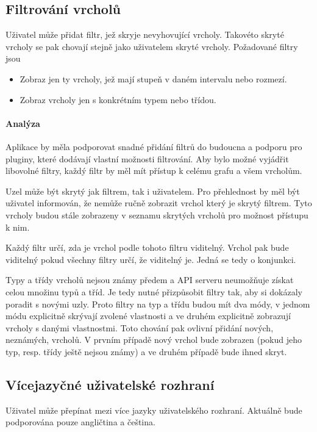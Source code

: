 \subsection{Filtrování vrcholů}
Uživatel může přidat filtr, jež skryje nevyhovující vrcholy. Takovéto skryté vrcholy se pak chovají stejně jako uživatelem skryté vrcholy. Požadované filtry jsou
\begin{itemize}
    \item Zobraz jen ty vrcholy, jež mají stupeň v daném intervalu nebo rozmezí.
    \item Zobraz vrcholy jen s konkrétním typem nebo třídou.
\end{itemize}

\paragraph{Analýza} Aplikace by měla podporovat snadné přidání filtrů do budoucna a podporu pro pluginy, které dodávají vlastní možnosti filtrování. Aby bylo možné vyjádřit libovolné filtry, každý filtr by měl mít přístup k celému grafu a všem vrcholům.

Uzel může být skrytý jak filtrem, tak i uživatelem. Pro přehlednost by měl být uživatel informován, že nemůže ručně zobrazit vrchol který je skrytý filtrem. Tyto vrcholy budou stále zobrazeny v seznamu skrytých vrcholů pro možnost přístupu k nim.

Každý filtr určí, zda je vrchol podle tohoto filtru viditelný. Vrchol pak bude viditelný pokud všechny filtry určí, že viditelný je. Jedná se tedy o konjunkci.

Typy a třídy vrcholů nejsou známy předem a API serveru neumožňuje získat celou množinu typů a tříd. Je tedy nutné přizpůsobit filtry tak, aby si dokázaly poradit s novými uzly. Proto filtry na typ a třídu budou mít dva módy, v jednom módu explicitně skrývají zvolené vlastnosti a ve druhém explicitně zobrazují vrcholy s danými vlastnostmi. Toto chování pak ovlivní přidání nových, neznámých, vrcholů. V prvním případě nový vrchol bude zobrazen (pokud jeho typ, resp. třídy ještě nejsou známy) a ve druhém případě bude ihned skryt.

\subsection{Vícejazyčné uživatelské rozhraní}
Uživatel může přepínat mezi více jazyky uživatelského rozhraní. Aktuálně bude podporována pouze angličtina a čeština.

